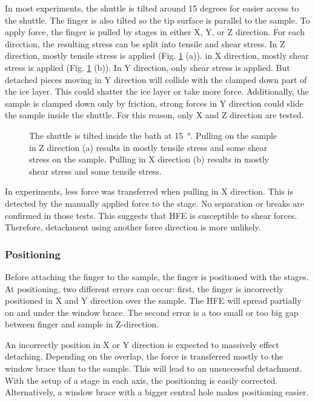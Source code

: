 In most experiments, the shuttle is tilted around 15 degrees for easier access to the shuttle. The finger is also tilted so the tip surface is parallel to the sample. To apply force, the finger is pulled by stages in either X, Y, or Z direction. For each direction, the resulting stress can be split into tensile and shear stress. In Z direction, mostly tensile stress is applied (Fig. \ref{fig:tensilevsshear} (a)). in X direction, mostly shear stress is applied (Fig. \ref{fig:tensilevsshear} (b)). In Y direction, only shear stress is applied. But detached pieces moving in Y direction will collide with the clamped down part of the ice layer. This could shatter the ice layer or take more force. Additionally, the sample is clamped down only by friction, strong forces in Y direction could slide the sample inside the shuttle. For this reason, only X and Z direction are tested.

\begin{figure}[hbt!]
	\centering
	
	\caption{The shuttle is tilted inside the bath at \SI{15}{\degree}. Pulling on the sample in Z direction (a) results in mostly tensile stress and some shear stress on the sample. Pulling in X direction (b) results in mostly shear stress and some tensile stress.}
	\label{fig:tensilevsshear}
\end{figure}

In experiments, less force was transferred when pulling in X direction. This is detected by the manually applied force to the stage. No separation or breaks are confirmed in those tests. This suggests that HFE is susceptible to shear forces. Therefore, detachment using another force direction is more unlikely. 

\subsubsection{Positioning}
\label{section:positioning}

Before attaching the finger to the sample, the finger is positioned with the stages. At positioning, two different errors can occur: first, the finger is incorrectly positioned in X and Y direction over the sample. The HFE will spread partially on and under the window brace. The second error is a too small or too big gap between finger and sample in Z-direction. 

An incorrectly position in X or Y direction is expected to massively effect detaching. Depending on the overlap, the force is transferred mostly to the window brace than to the sample. This will lead to an unsuccessful detachment. With the setup of a stage in each axis, the positioning is easily corrected. Alternatively, a window brace with a bigger central hole makes positioning easier.

